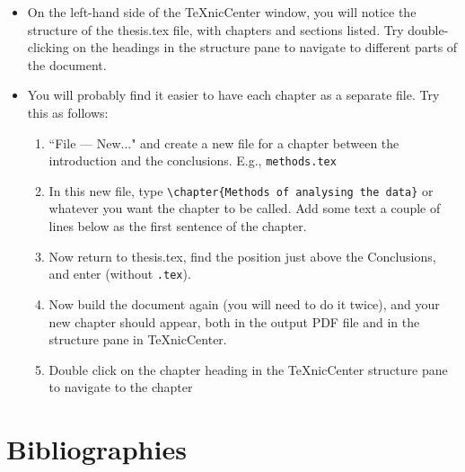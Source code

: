 \documentclass[a4paper]{article}
\begin{document}
\begin{itemize}
\item On the left-hand side of the TeXnicCenter window, you will notice the structure of the thesis.tex file, with chapters and sections listed.  Try double-clicking on the headings in the structure pane to navigate to different parts of the document.
\item You will probably find it easier to have each chapter as a separate file. Try this as follows:
\begin{enumerate}
\item ``File --- New..." and create a new file for a chapter between the introduction and the conclusions.  E.g., \verb=methods.tex=
\item In this new file, type \verb=\chapter{Methods of analysing the data}= or whatever you want the chapter to be called.  Add some text a couple of lines below as the first sentence of the chapter.
\item Now return to thesis.tex, find the position just above the Conclusions, and enter \verb== (without \verb=.tex=).
\item Now build the document again (you will need to do it twice), and your new chapter should appear, both in the output PDF file and in the structure pane in TeXnicCenter.
\item Double click on the chapter heading in the TeXnicCenter structure pane to navigate to the chapter
\end{enumerate}
\end{itemize}

\section{Bibliographies}
\end{document}
